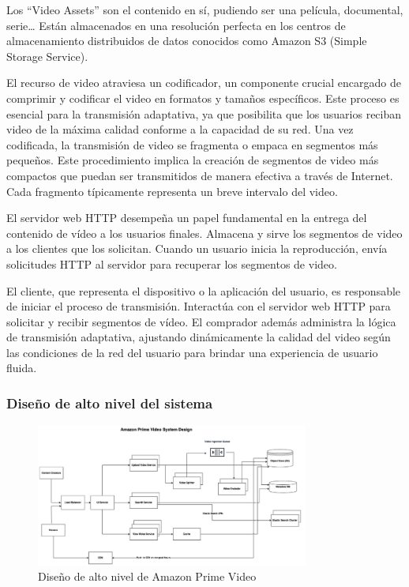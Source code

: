 \documentclass[12pt,a4paper]{article}
\begin{document}
    Los “Video Assets” son el contenido en sí, pudiendo ser una película, documental, serie… Están almacenados en una resolución perfecta en los centros de almacenamiento distribuidos de datos conocidos como Amazon S3 (Simple Storage Service).

    El recurso de video atraviesa un codificador, un componente crucial encargado de comprimir y codificar el video en formatos y tamaños específicos. Este proceso es esencial para la transmisión adaptativa, ya que posibilita que los usuarios reciban video de la máxima calidad conforme a la capacidad de su red. Una vez codificada, la transmisión de video se fragmenta o empaca en segmentos más pequeños. Este procedimiento implica la creación de segmentos de video más compactos que puedan ser transmitidos de manera efectiva a través de Internet. Cada fragmento típicamente representa un breve intervalo del video. \cite{bhasin2024}

    El servidor web HTTP desempeña un papel fundamental en la entrega del contenido de vídeo a los usuarios finales. Almacena y sirve los segmentos de video a los clientes que los solicitan. Cuando un usuario inicia la reproducción, envía solicitudes HTTP al servidor para recuperar los segmentos de video.

    El cliente, que representa el dispositivo o la aplicación del usuario, es responsable de iniciar el proceso de transmisión. Interactúa con el servidor web HTTP para solicitar y recibir segmentos de vídeo. El comprador además administra la lógica de transmisión adaptativa, ajustando dinámicamente la calidad del video según las condiciones de la red del usuario para brindar una experiencia de usuario fluida.

    \subsubsection{Diseño de alto nivel del sistema}

    \begin{figure}[H]
        \centering
        \includegraphics[width=0.8\textwidth]{./img/alto_nivel_amazon.png}
        \caption{Diseño de alto nivel de Amazon Prime Video}
        \label{fig:amazon_alto_nivel}
    \end{figure}
\end{document}
